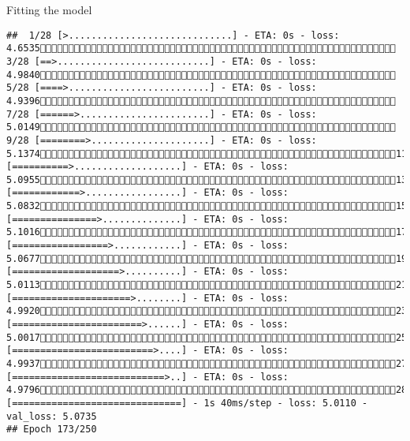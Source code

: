 \documentclass[
  ignorenonframetext,
]{beamer}
\begin{document}
\begin{frame}[fragile]{Fitting the model}
\begin{verbatim}
##  1/28 [>.............................] - ETA: 0s - loss: 4.6535 3/28 [==>...........................] - ETA: 0s - loss: 4.9840 5/28 [====>.........................] - ETA: 0s - loss: 4.9396 7/28 [======>.......................] - ETA: 0s - loss: 5.0149 9/28 [========>.....................] - ETA: 0s - loss: 5.137411/28 [==========>...................] - ETA: 0s - loss: 5.095513/28 [============>.................] - ETA: 0s - loss: 5.083215/28 [===============>..............] - ETA: 0s - loss: 5.101617/28 [=================>............] - ETA: 0s - loss: 5.067719/28 [===================>..........] - ETA: 0s - loss: 5.011321/28 [=====================>........] - ETA: 0s - loss: 4.992023/28 [=======================>......] - ETA: 0s - loss: 5.001725/28 [=========================>....] - ETA: 0s - loss: 4.993727/28 [===========================>..] - ETA: 0s - loss: 4.979628/28 [==============================] - 1s 40ms/step - loss: 5.0110 - val_loss: 5.0735
## Epoch 173/250

\end{verbatim}
\end{frame}
\end{document}
